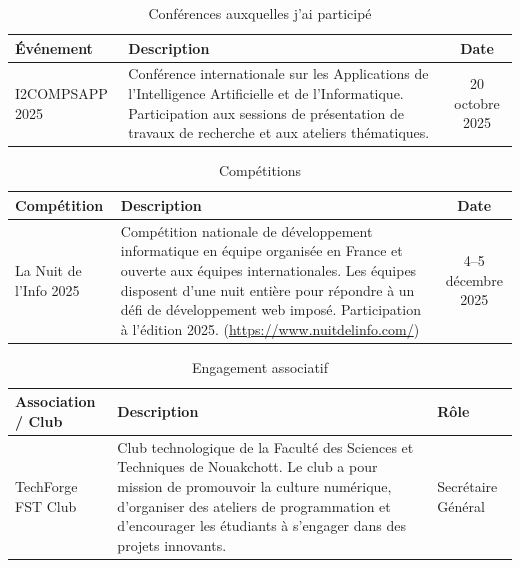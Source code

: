 ﻿\documentclass[12pt,a4paper]{report}
\begin{document}
\begin{table}[H]
\centering
\begin{tabularx}{\textwidth}{|l|X|c|}
\hline
\textbf{Événement} & \textbf{Description} & \textbf{Date} \\
\hline
I2COMPSAPP 2025 &
Conférence internationale sur les Applications de l'Intelligence Artificielle et de l'Informatique.
Participation aux sessions de présentation de travaux de recherche et aux ateliers thématiques. &
20 octobre 2025 \\
\hline
\end{tabularx}
\caption{Conférences auxquelles j'ai participé}
\end{table}

\medskip
{}
\medskip

\begin{table}[H]
\centering
\begin{tabularx}{\textwidth}{|l|X|c|}
\hline
\textbf{Compétition} & \textbf{Description} & \textbf{Date} \\
\hline
La Nuit de l'Info 2025 &
Compétition nationale de développement informatique en équipe organisée en France et ouverte aux
équipes internationales. Les équipes disposent d'une nuit entière pour répondre à un défi de
développement web imposé. Participation à l'édition 2025.
(\url{https://www.nuitdelinfo.com/}) &
4--5 décembre 2025 \\
\hline
\end{tabularx}
\caption{Compétitions}
\end{table}

\medskip
{}
\medskip

\begin{table}[H]
\centering
\begin{tabularx}{\textwidth}{|l|X|l|}
\hline
\textbf{Association / Club} & \textbf{Description} & \textbf{Rôle} \\
\hline
TechForge FST Club &
Club technologique de la Faculté des Sciences et Techniques de Nouakchott. Le club a pour mission
de promouvoir la culture numérique, d'organiser des ateliers de programmation et d'encourager les
étudiants à s'engager dans des projets innovants. &
Secrétaire Général \\
\hline
\end{tabularx}
\caption{Engagement associatif}
\end{table}
\end{document}
